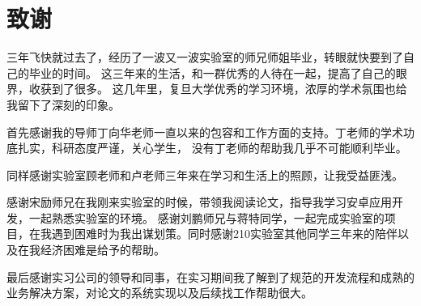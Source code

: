 \chapter{致谢}

三年飞快就过去了，经历了一波又一波实验室的师兄师姐毕业，转眼就快要到了自己的毕业的时间。 这三年来的生活，和一群优秀的人待在一起，提高了自己的眼界，收获到了很多。
这几年里，复旦大学优秀的学习环境，浓厚的学术氛围也给我留下了深刻的印象。

首先感谢我的导师丁向华老师一直以来的包容和工作方面的支持。丁老师的学术功底扎实，科研态度严谨，关心学生， 没有丁老师的帮助我几乎不可能顺利毕业。

同样感谢实验室顾老师和卢老师三年来在学习和生活上的照顾，让我受益匪浅。

感谢宋励师兄在我刚来实验室的时候，带领我阅读论文，指导我学习安卓应用开发，一起熟悉实验室的环境。 
感谢刘鹏师兄与蒋特同学，一起完成实验室的项目，在我遇到困难时为我出谋划策。同时感谢210实验室其他同学三年来的陪伴以及在我经济困难是给予的帮助。

最后感谢实习公司的领导和同事，在实习期间我了解到了规范的开发流程和成熟的业务解决方案，对论文的系统实现以及后续找工作帮助很大。
